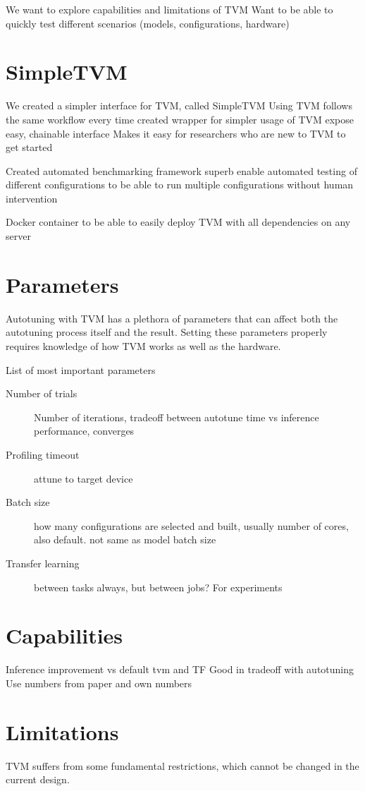 We want to explore capabilities and limitations of TVM
Want to be able to quickly test different scenarios (models, configurations, hardware)

\section{SimpleTVM}
We created a simpler interface for TVM, called SimpleTVM
Using TVM follows the same workflow every time
created wrapper for simpler usage of TVM
expose easy, chainable interface
Makes it easy for researchers who are new to TVM to get started

Created automated benchmarking framework superb
enable automated testing of different configurations to be able to run multiple configurations without human intervention

Docker container to be able to easily deploy TVM with all dependencies on any server

\section{Parameters}
Autotuning with TVM has a plethora of parameters that can affect both the autotuning process itself and the result.
Setting these parameters properly requires knowledge of how TVM works as well as the hardware.

List of most important parameters
\begin{description}
	\item[Number of trials] Number of iterations, tradeoff between autotune time vs inference performance, converges
	\item[Profiling timeout] attune to target device
	\item[Batch size] how many configurations are selected and built, usually number of cores, also default. not same as model batch size
	\item[Transfer learning] between tasks always, but between jobs? For experiments
\end{description}


\section{Capabilities}
Inference improvement vs default tvm and TF
Good in tradeoff with autotuning
Use numbers from paper and own numbers

\section{Limitations}
TVM suffers from some fundamental restrictions, which cannot be changed in the current design.

